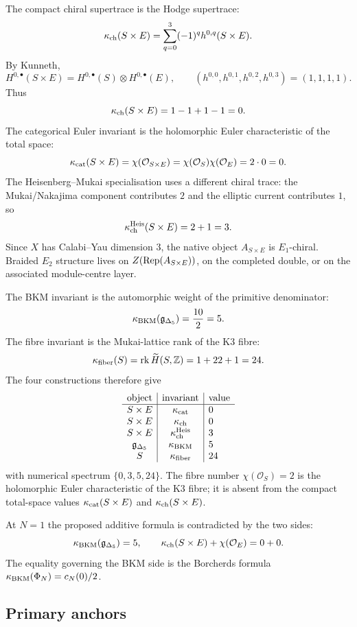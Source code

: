 The compact chiral supertrace is the Hodge supertrace:
\[
  \kappa_{\mathrm{ch}}(S\times E)
  =
  \sum_{q=0}^3(-1)^q h^{0,q}(S\times E).
\]
By Kunneth,
\[
  H^{0,\bullet}(S\times E)
  =
  H^{0,\bullet}(S)\otimes H^{0,\bullet}(E),
  \qquad
  (h^{0,0},h^{0,1},h^{0,2},h^{0,3})=(1,1,1,1).
\]
Thus
\[
  \kappa_{\mathrm{ch}}(S\times E)=1-1+1-1=0 .
\]
The categorical Euler invariant is the holomorphic Euler
characteristic of the total space:
\[
  \kappa_{\mathrm{cat}}(S\times E)
  =
  \chi(\mathcal O_{S\times E})
  =
  \chi(\mathcal O_S)\chi(\mathcal O_E)
  =
  2\cdot0
  =
  0 .
\]
The Heisenberg--Mukai specialisation uses a different chiral trace:
the Mukai/Nakajima component contributes $2$ and the elliptic current
contributes $1$, so
\[
  \kappa_{\mathrm{ch}}^{\mathrm{Heis}}(S\times E)=2+1=3.
\]
Since $X$ has Calabi--Yau dimension $3$, the native object
$A_{S\times E}$ is $E_1$-chiral.  Braided $E_2$ structure lives on
$Z(\operatorname{Rep}(A_{S\times E}))$, on the completed double, or on the associated
module-centre layer.

The BKM invariant is the automorphic weight of the primitive
denominator:
\[
  \kappa_{\mathrm{BKM}}(\mathfrak g_{\Delta_5})=\frac{10}{2}=5.
\]
The fibre invariant is the Mukai-lattice rank of the K3 fibre:
\[
  \kappa_{\mathrm{fiber}}(S)=\operatorname{rk}\widetilde H(S,\mathbb Z)=1+22+1=24.
\]
The four constructions therefore give
\[
\begin{array}{c|c|l}
\text{object} & \text{invariant} & \text{value}\\
\hline
S\times E & \kappa_{\mathrm{cat}} & 0\\
S\times E & \kappa_{\mathrm{ch}} & 0\\
S\times E & \kappa_{\mathrm{ch}}^{\mathrm{Heis}} & 3\\
\mathfrak g_{\Delta_5} & \kappa_{\mathrm{BKM}} & 5\\
S & \kappa_{\mathrm{fiber}} & 24
\end{array}
\]
with numerical spectrum $\{0,3,5,24\}$.  The fibre number
$\chi(\mathcal O_S)=2$ is the holomorphic Euler characteristic of the
K3 fibre; it is absent from the compact total-space values
$\kappa_{\mathrm{cat}}(S\times E)$ and $\kappa_{\mathrm{ch}}(S\times E)$.

At $N=1$ the proposed additive formula is contradicted by the two sides:
\[
  \kappa_{\mathrm{BKM}}(\mathfrak g_{\Delta_5})
  =
  5,
  \qquad
  \kappa_{\mathrm{ch}}(S\times E)+\chi(\mathcal O_E)
  =
  0+0 .
\]
The equality governing the BKM side is the Borcherds formula
$\kappa_{\mathrm{BKM}}(\Phi_N)=c_N(0)/2$.

\subsection*{Primary anchors}

